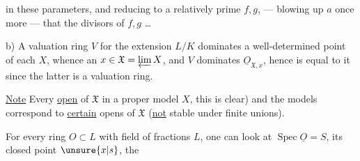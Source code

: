 in these parameters, and reducing to a relatively prime $f,g$,  --- blowing up $a$ once more --- that the divisors of $f,g$  \ldots

b) A valuation ring $V$  for the extension $L/K$ dominates a well-determined point of each $X$, whence an $x\in\mathfrak X=\varprojlim X$, and $V$ dominates $\underline{O}_{\mathfrak X,x}$, hence is equal to it since the latter is a valuation ring.

\uline{Note} Every  \uline{open} of $\mathfrak X$    in a proper model $X$, this is clear) and  the models correspond to \uline{certain} opens of $\mathfrak X$ (\uline{not} stable under finite unions).

For every   ring $O\subset L$ with field of fractions $L$, one can look at $\operatorname{Spec}\underline{O}=S$, its closed point $\unsure{x|s}$, the 
